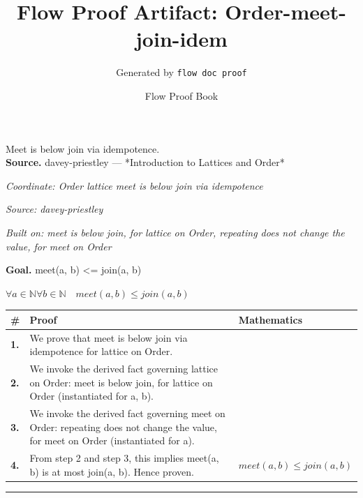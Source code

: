 \documentclass[11pt]{article}
\title{Flow Proof Artifact: Order-meet-join-idem}
\author{Generated by \texttt{flow doc proof}}
\date{Flow Proof Book}
\theoremstyle{definition}
\begin{document}
\maketitle
Meet is below join via idempotence.\\[0.5em]
\textbf{Source.} davey-priestley — *Introduction to Lattices and Order*\\[0.5em]
\bigskip
{}\par
\smallskip\noindent\textit{Coordinate: Order \cdot lattice \cdot meet is below join via idempotence}\par
\smallskip\noindent\textit{Source: davey-priestley}\par
\smallskip\noindent\textit{Built on: meet is below join, for lattice on Order, repeating does not change the value, for meet on Order}\par
\medskip
\noindent\textbf{Goal.} meet(a, b) <= join(a, b)\par
\noindent$\displaystyle \forall a \in \mathbb{N} \forall b \in \mathbb{N}\quad meet(a, b) \le join(a, b)$\par
\medskip
\noindent
\begin{tabular}{@{} >{\raggedright\arraybackslash}p{} >{\raggedright\arraybackslash}p{} >{\raggedleft\arraybackslash}p{} @{}}
\textbf{\#} & \textbf{Proof} & \textbf{Mathematics} \\
\midrule
\textbf{1.} & We prove that meet is below join via idempotence for lattice on Order. & \\[0.45em]
\textbf{2.} & We invoke the derived fact governing lattice on Order: meet is below join, for lattice on Order (instantiated for a, b). & \\[0.45em]
\textbf{3.} & We invoke the derived fact governing meet on Order: repeating does not change the value, for meet on Order (instantiated for a). & \\[0.45em]
\textbf{4.} & From step 2 and step 3, this implies meet(a, b) is at most join(a, b). Hence proven. & $\displaystyle meet(a, b) \le join(a, b)$ \\[0.45em]
\bottomrule
\end{tabular}
\label{thm:Order-lattice-meet_is_below_join_via_idempotence}
\par\medskip\hrule
\end{document}
